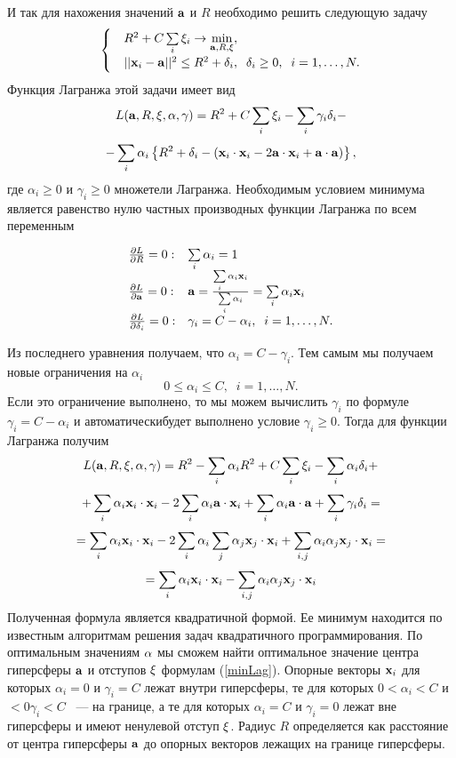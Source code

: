 И так для нахожения значений $\mathbf{a}$ и $R$ необходимо решить следующую задачу
\begin{equation}
			\begin{cases}
			&R^2 + C\sum\limits_{i}\xi_i \to \min\limits_{\mathbf{a}, R,\mathbf{\xi}}, \\
			&||\mathbf{x}_i-\mathbf{a}||^2\leq R^2 + \delta_i,\;\;\delta_i\geq0,\;\;i = 1,\ldots,N.
			\end{cases} 
\end{equation}
Функция Лагранжа этой задачи имеет вид
$$L(\mathbf{a}, R,\mathbf{\xi},\mathbf{\alpha},\mathbf{\gamma})=R^2 + C\sum\limits_{i}\xi_i-\sum\limits_{i}\gamma_i\delta_i-$$
$$-\sum\limits_{i}\alpha_i\left\{R^2 + \delta_i-\left(\mathbf{x}_i\cdot\mathbf{x}_i-2\mathbf{a}\cdot\mathbf{x}_i+\mathbf{a}\cdot\mathbf{a}\right)\right\},$$
где $\alpha_i\geq 0$  и $\gamma_i\geq 0$ множетели Лагранжа.
Необходимым условием минимума является равенство нулю частных производных функции Лагранжа по всем переменным

\begin{equation}
\label{minLag}
\begin{array}{ll}
\frac{\partial L}{\partial R} = 0: & \sum\limits_{i} \alpha_i = 1\\
\frac{\partial L}{\partial \mathbf{a}} = 0: & \mathbf{a} = \frac{\sum\limits_{i}\alpha_i\mathbf{x}_i}{\sum\limits_{i} \alpha_i}= \sum\limits_{i} \alpha_i\mathbf{x}_i\\
\frac{\partial L}{\partial \delta_i} = 0: & \gamma_i = C - \alpha_i, \;\; i = 1,\ldots,N.\\
\end{array}
\end{equation}

Из последнего уравнения получаем, что $\alpha_i = C - \gamma_i$. Тем самым мы получаем новые ограничения на $\alpha_i$ 
$$0\leq\alpha_i\leq C, \;\; i = 1,\ldots,N.$$
Если это ограничение выполнено, то мы можем вычислить $\gamma_i$ по формуле $\gamma_i = C - \alpha_i$ и автоматическибудет выполнено условие $\gamma_i\geq 0$.
Тогда для функции Лагранжа получим
$$L(\mathbf{a}, R,\mathbf{\xi},\mathbf{\alpha},\mathbf{\gamma})=R^2-\sum\limits_{i}\alpha_iR^2 + 
C\sum\limits_{i}\xi_i-\sum\limits_{i}\alpha_i\delta_i+$$
$$+\sum\limits_{i}\alpha_i\mathbf{x}_i\cdot\mathbf{x}_i-2\sum\limits_{i}\alpha_i\mathbf{a}\cdot\mathbf{x}_i+\sum\limits_{i}\alpha_i\mathbf{a}\cdot\mathbf{a} +\sum\limits_{i}\gamma_i\delta_i=$$ 
$$ = \sum\limits_{i}\alpha_i\mathbf{x}_i\cdot\mathbf{x}_i-
2 \sum\limits_{i}\alpha_i \sum\limits_{j} \alpha_j \mathbf{x}_j\cdot \mathbf{x}_i+\sum\limits_{i,j}\alpha_i\alpha_j \mathbf{x}_j\cdot \mathbf{x}_i=$$
$$=\sum\limits_{i}\alpha_i\mathbf{x}_i\cdot\mathbf{x}_i-\sum\limits_{i,j}\alpha_i\alpha_j\mathbf{x}_j\cdot\mathbf{x}_i$$
Полученная формула является квадратичной формой. Ее минимум находится по известным алгоритмам решения задач квадратичного программирования. По оптимальным значениям $\mathbf{\alpha}$ мы сможем найти оптимальное значение центра гиперсферы $\mathbf{a}$ и отступов $\mathbf{\xi}$  формулам (\ref{minLag}). Опорные векторы $\mathbf{x}_i$ для которых $\alpha_i=0$ и $\gamma_i=C$ лежат внутри гиперсферы, те для которых $0<\alpha_i<C$ и $<0\gamma_i<C$ ~--- на границе, а те для которых $\alpha_i=C$ и $\gamma_i=0$ лежат вне гиперсферы и имеют ненулевой отступ $\mathbf{\xi}$. Радиус $R$ определяется как расстояние от центра гиперсферы $\mathbf{a}$ до опорных векторов лежащих на границе гиперсферы.
